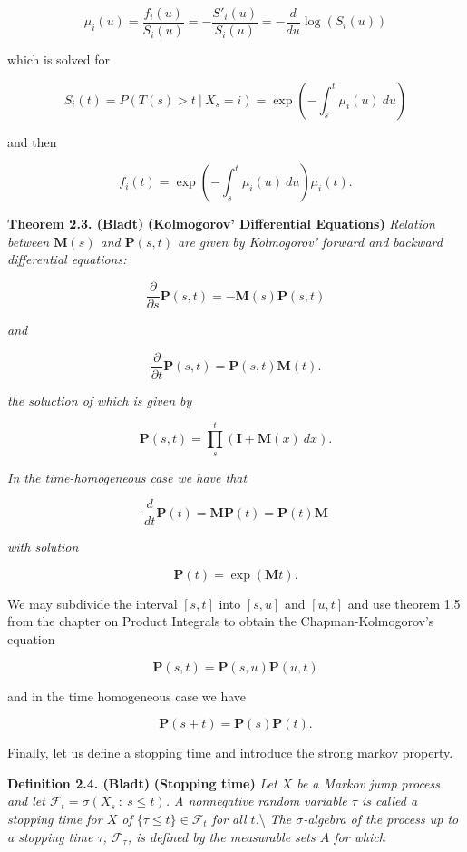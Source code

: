\documentclass[a4paper,10pt,openany]{book}
\begin{document}
\[
\mu_i(u)=\frac{f_i(u)}{S_i(u)}=-\frac{S'_i(u)}{S_i(u)}=-\frac{d}{du}\log(S_i(u))
\]

which is solved for

\[
S_i(t)=P(T(s)>t\ \vert\ X_s=i)=\exp\left(-\int_s^t \mu_i(u)\ du\right)
\]

and then

\[
f_i(t)=\exp\left(-\int_s^t \mu_i(u)\ du\right)\mu_i(t).
\]

\textbf{Theorem 2.3. (Bladt)} \textbf{(Kolmogorov' Differential Equations)} \emph{Relation between \(\mathbf{M}(s)\) and \(\mathbf{P}(s,t)\) are given by Kolmogorov' forward and backward differential equations:}

\[
\frac{\partial}{\partial s}\mathbf{P}(s,t)=-\mathbf{M}(s)\mathbf{P}(s,t)
\]

\emph{and}

\[
\frac{\partial}{\partial t}\mathbf{P}(s,t)=\mathbf{P}(s,t)\mathbf{M}(t).
\]

\emph{the soluction of which is given by}

\[
\mathbf{P}(s,t)=\prod_s^t(\mathbf{I}+\mathbf{M}(x)\ dx).
\]

\emph{In the time-homogeneous case we have that}

\[
\frac{d}{d t}\mathbf{P}(t)=\mathbf{M}\mathbf{P}(t)=\mathbf{P}(t)\mathbf{M}
\]

\emph{with solution}

\[
\mathbf{P}(t)=\exp(\mathbf{M}t).
\]

We may subdivide the interval \([s,t]\) into \([s,u]\) and \([u,t]\) and use theorem 1.5 from the chapter on Product Integrals to obtain the Chapman-Kolmogorov's equation

\[
\mathbf{P}(s,t)=\mathbf{P}(s,u)\mathbf{P}(u,t)
\]

and in the time homogeneous case we have

\[
\mathbf{P}(s+t)=\mathbf{P}(s)\mathbf{P}(t).
\]

Finally, let us define a stopping time and introduce the strong markov property.

\textbf{Definition 2.4. (Bladt)} \textbf{(Stopping time)} \emph{Let \(X\) be a Markov jump process and let \(\mathcal{F}_t=\sigma(X_s\ :\ s\le t)\). A nonnegative random variable \(\tau\) is called a stopping time for \(X\) of \(\{\tau \le t\}\in\mathcal{F}_t\) for all \(t\).}\textbackslash{}
\emph{The \(\sigma\)-algebra of the process up to a stopping time \(\tau\), \(\mathcal{F}_\tau\), is defined by the measurable sets \(A\) for which}
\end{document}
